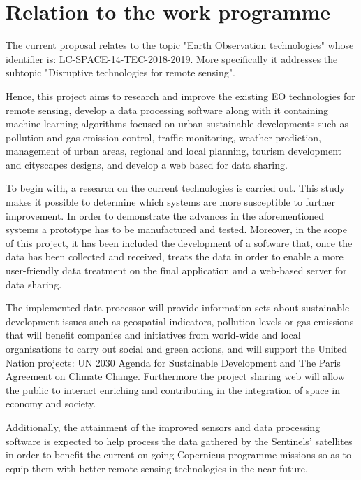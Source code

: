 \section{Relation to the work programme}
The current proposal relates to the topic "Earth Observation technologies" whose identifier is: LC-SPACE-14-TEC-2018-2019. More specifically it addresses the subtopic "Disruptive technologies for remote sensing". 

Hence, this project aims to research and improve the existing EO technologies for remote sensing, develop a data processing software along with it containing machine learning algorithms focused on urban sustainable developments such as pollution and gas emission control, traffic monitoring, weather prediction, management of urban areas, regional and local planning, tourism development and cityscapes designs, and develop a web based for data sharing. 

To begin with, a research on the current technologies is carried out. This study makes it possible to determine which systems are more susceptible to further improvement. In order to demonstrate the advances in the aforementioned systems a prototype has to be manufactured and tested. Moreover, in the scope of this project, it has been included the development of a software that, once the data has been collected and received, treats the data in order to enable a more user-friendly data treatment on the final application and a web-based server for data sharing.

The implemented data processor will provide information sets about sustainable development issues such as geospatial indicators, pollution levels or gas emissions that will benefit companies and initiatives from world-wide and local organisations to carry out social and green actions, and will support the United Nation projects: UN 2030 Agenda for Sustainable Development and The Paris Agreement on Climate Change. Furthermore the project sharing web will allow the public to interact enriching and contributing in the integration of space in economy and society.
 
Additionally, the attainment of the improved sensors and data processing software is expected to help process the data gathered by the Sentinels' satellites in order to benefit the current on-going Copernicus programme missions so as to equip them with better remote sensing technologies in the near future.  